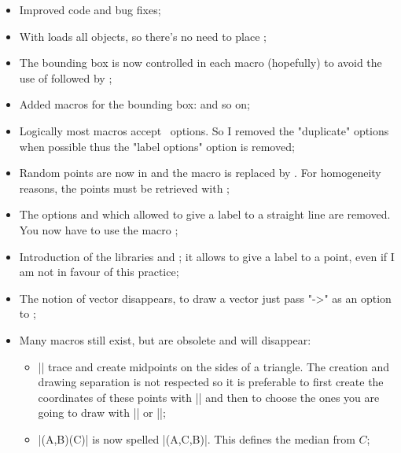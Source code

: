  \begin{itemize}\setlength{\itemsep}{10pt}

\item Improved code and bug fixes;

\item With  loads all objects, so there's no need to place ;\item The bounding box is now controlled in each macro (hopefully) to avoid the use of  followed by ;\item Added macros for the bounding box:   and so on;\item  Logically most macros accept \TIKZ\ options. So I removed the "duplicate" options when possible thus the "label options" option is removed;

\item Random points are now in \tkzname{\tkznameofpack} and the macro  is replaced by . For homogeneity reasons, the points must be retrieved with ;

\item The options  and  which allowed to give a label to a straight  line are removed. You now have to use the macro ;

\item Introduction of the libraries  and ; it allows to give a label to a point, even if I am not in favour of this practice;

\item  The notion of vector disappears, to draw a vector just pass "->" as an option to ;

\item Many macros still exist, but are obsolete and will disappear:
\begin{itemize}

\item |\tkzDrawMedians| trace and create midpoints on the sides of a triangle. The creation and drawing separation is not respected so it is preferable to first create the coordinates of these points with |\tkzSpcTriangle[median]| and then to choose the ones you are going to draw with |\tkzDrawSegments| or |\tkzDrawLines|;

\item |\tkzDrawMedians(A,B)(C)| is now spelled |\tkzDrawMedians(A,C,B)|. This defines the median from $C$;


\end{itemize}
\end{itemize}
